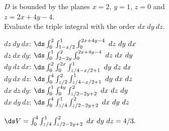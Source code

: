 {\label{13_06_ex_11}$D$ is bounded by the planes $x=2$, $y=1$,  $z=0$ and \\
 $z=2x+4y-4$.\\

Evaluate the triple integral with the order $dx\ dy\ dz$.

}
{$dz\ dy\ dx$: $\ds\int_0^2\int_{1-x/2}^{1}\int_{0}^{2x+4y-4}\ dz\ dy\ dx$\\
	$dz\ dx\ dy$: $\ds\int_{0}^1\int_{2-2y}^{2}\int_{0}^{2x+4y-4}\ dz\ dx\ dy$\\
	$dy\ dz\ dx$: $\ds\int_0^2\int_0^{2x}\int_{z/4-x/2+1}^{1}\ dy\ dz\ dx$\\
	$dy\ dx\ dz$: $\ds\int_0^4\int_{z/2}^{2}\int_{z/4-x/2+1}^{1}\ dy\ dx\ dz$\\
	$dx\ dz\ dy$: $\ds\int_{0}^1\int_{0}^{4y}\int_{z/2-2y+2}^2\ dx\ dz\ dy$\\
	$dx\ dy\ dz$: $\ds\int_0^4\int_{z/4}^{1}\int_{z/2-2y+2}^2\ dx\ dy\ dz$
	
	$\ds V = \int_0^4\int_{z/4}^{1}\int_{z/2-2y+2}^2\ dx\ dy\ dz = 4/3.$
}
